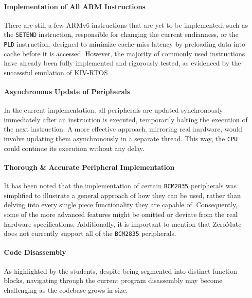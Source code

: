 \documentclass[english, ing, kiv, he, iso690numb, pdf]{fasthesis}
\begin{document}
	\paragraph{Implementation of All ARM Instructions}
	
	There are still a few ARMv6 instructions that are yet to be implemented, such as the \texttt{SETEND} instruction, responsible for changing the current endianness, or the \texttt{PLD} instruction, designed to minimize cache-miss latency by preloading data into cache before it is accessed. However, the majority of commonly used instructions have already been fully implemented and rigorously tested, as evidenced by the successful emulation of KIV-RTOS \cite{KIV-RTOS}.
	
	\paragraph{Asynchronous Update of Peripherals}
	
	In the current implementation, all peripherals are updated synchronously immediately after an instruction is executed, temporarily halting the execution of the next instruction. A more effective approach, mirroring real hardware, would involve updating them asynchronously in a separate thread. This way, the \texttt{CPU} could continue its execution without any delay.
	
	\paragraph{Thorough \& Accurate Peripheral Implementation}
	
	It has been noted that the implementation of certain \texttt{BCM2835} peripherals was simplified to illustrate a general approach of how they can be used, rather than delving into every single piece functionality they are capable of. Consequently, some of the more advanced features might be omitted or deviate from the real hardware specifications. Additionally, it is important to mention that ZeroMate does not currently support all of the \texttt{BCM2835} peripherals.
	
	\paragraph{Code Disassembly}
	
	As highlighted by the students, despite being segmented into distinct function blocks, navigating through the current program disassembly may become challenging as the codebase grows in size.
	
\end{document}
